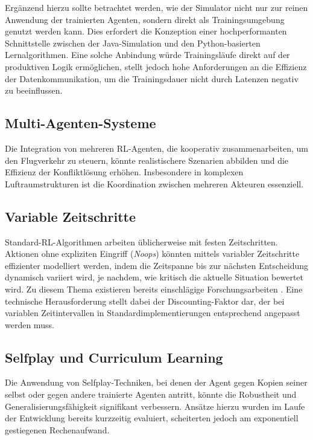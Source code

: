 Ergänzend hierzu sollte betrachtet werden, wie der Simulator nicht nur zur reinen Anwendung der trainierten Agenten, sondern direkt als Trainingsumgebung genutzt werden kann. Dies erfordert die Konzeption einer hochperformanten Schnittstelle zwischen der Java-Simulation und den Python-basierten Lernalgorithmen. Eine solche Anbindung würde Trainingsläufe direkt auf der produktiven Logik ermöglichen, stellt jedoch hohe Anforderungen an die Effizienz der Datenkommunikation, um die Trainingsdauer nicht durch Latenzen negativ zu beeinflussen.
\medskip


\subsection*{Multi-Agenten-Systeme}
Die Integration von mehreren \ac{RL}\hyp{}Agenten, die kooperativ zusammenarbeiten, um den Flugverkehr zu steuern, könnte realistischere Szenarien abbilden und die Effizienz der Konfliktlösung erhöhen. Insbesondere in komplexen Luftraumstrukturen ist die Koordination zwischen mehreren Akteuren essenziell.

\subsection*{Variable Zeitschritte}
Standard-\ac{RL}\hyp{}Algorithmen arbeiten üblicherweise mit festen Zeitschritten. Aktionen ohne expliziten Eingriff (\emph{Noops}) könnten mittels variabler Zeitschritte effizienter modelliert werden, indem die Zeitspanne bis zur nächsten Entscheidung dynamisch variiert wird, je nachdem, wie kritisch die aktuelle Situation bewertet wird. Zu diesem Thema existieren bereits einschlägige Forschungsarbeiten \cite{wang2024variabletimestepreinforcement}. Eine technische Herausforderung stellt dabei der Discounting-Faktor dar, der bei variablen Zeitintervallen in Standardimplementierungen entsprechend angepasst werden muss.

\subsection*{Selfplay und Curriculum Learning}
Die Anwendung von Selfplay-Techniken, bei denen der Agent gegen Kopien seiner selbst oder gegen andere trainierte Agenten antritt, könnte die Robustheit und Generalisierungsfähigkeit signifikant verbessern. Ansätze hierzu wurden im Laufe der Entwicklung bereits kurzzeitig evaluiert, scheiterten jedoch am exponentiell gestiegenen Rechenaufwand. 
\medskip

